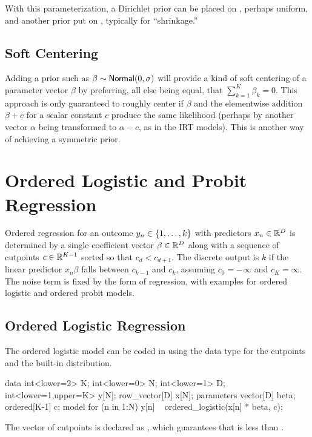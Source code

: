 With this parameterization, a Dirichlet prior can be placed on
, perhaps uniform, and another prior put on
, typically for ``shrinkage.''  


\subsection{Soft Centering}

Adding a prior such as $\beta \sim \distro{Normal}(0,\sigma)$ will provide a kind
of soft centering of a parameter vector $\beta$ by preferring, all
else being equal, that $\sum_{k=1}^K \beta_k = 0$.  This approach is only
guaranteed to roughly center  if $\beta$ and the elementwise addition $\beta + c$
for a scalar constant $c$ produce the same likelihood (perhaps by
another vector $\alpha$ being transformed to $\alpha - c$, as in the
IRT models).  This is another way of achieving a symmetric prior.


\section{Ordered Logistic and Probit Regression}\label{ordered-logistic.section}

Ordered regression for an outcome $y_n \in \setlist{1,\ldots, k}$ with
predictors $x_n \in \reals^D$ is determined by a single coefficient
vector $\beta \in \reals^D$ along with a sequence of cutpoints $c \in
\reals^{K-1}$ sorted so that $c_d < c_{d+1}$.  The discrete output is
$k$ if the linear predictor $x_n \beta$ falls between $c_{k-1}$ and
$c_k$, assuming $c_0 = -\infty$ and $c_K = \infty$.  The noise term is
fixed by the form of regression, with examples for ordered logistic
and ordered probit models.  

\subsection{Ordered Logistic Regression}

The ordered logistic model can be coded in \Stan using the
 data type for the cutpoints and the built-in
 distribution.
%

\begin{stancode}
data {
  int<lower=2> K;
  int<lower=0> N;
  int<lower=1> D;
  int<lower=1,upper=K> y[N];
  row_vector[D] x[N];
} 
parameters {
  vector[D] beta;
  ordered[K-1] c;
} 
model {
  for (n in 1:N)
    y[n] ~ ordered_logistic(x[n] * beta, c);
}
\end{stancode}
% 
The vector of cutpoints  is declared as ,
which guarantees that  is less than . 

